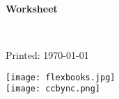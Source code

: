\documentclass[11pt,twoside,openany]{article}
\begin{document}
\begin{titlepage}
\begin{center}




\textbf{Worksheet}

 
 
\end{center}
 


~\vfill
\thispagestyle{empty}
{
  \setlength{\parindent}{0pt}
  \setlength{\parskip}{\baselineskip}
  Printed: \today

  \texttt{[image: flexbooks.jpg]}\\
  \texttt{[image: ccbync.png]}
}
\end{titlepage}


\pagestyle{plain}
\mainmatter{}
\setcounter{page}{1}

\clearpage


\end{document}
